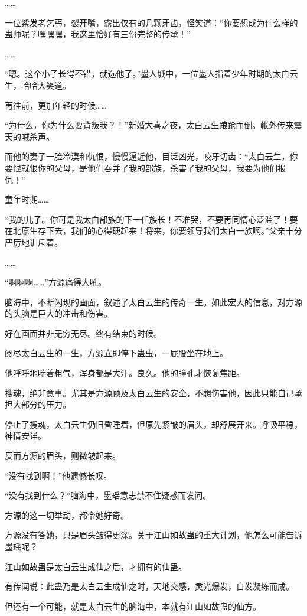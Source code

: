 \begin{this_body}
……

一位紫发老乞丐，裂开嘴，露出仅有的几颗牙齿，怪笑道：“你要想成为什么样的蛊师呢？嘿嘿嘿，我这里恰好有三份完整的传承！”

……

“嗯。这个小子长得不错，就选他了。”墨人城中，一位墨人指着少年时期的太白云生，哈哈大笑道。

再往前，更加年轻的时候……

“为什么，你为什么要背叛我？！”新婚大喜之夜，太白云生踉跄而倒。帐外传来震天的喊杀声。

而他的妻子一脸冷漠和仇恨，慢慢逼近他，目泛凶光，咬牙切齿：“太白云生，你要恨就恨你的父母，是他们吞并了我的部族，杀害了我的父母，我要为他们报仇！”

童年时期……

“我的儿子。你可是我太白部族的下一任族长！不准哭，不要再同情心泛滥了！要在北原生存下去，我们的心得硬起来！将来，你要领导我们太白一族啊。”父亲十分严厉地训斥着。

……

“啊啊啊……”方源痛得大吼。

脑海中，不断闪现的画面，叙述了太白云生的传奇一生。如此宏大的信息，对方源的头脑是巨大的冲击和伤害。

好在画面并非无穷无尽。终有结束的时候。

阅尽太白云生的一生，方源立即停下蛊虫，一屁股坐在地上。

他呼呼地喘着粗气，浑身都是大汗。良久。他的瞳孔才恢复焦距。

搜魂，绝非意事。尤其是方源顾及太白云生的安全，不想伤害他，因此只能自己承担大部分的压力。

停止了搜魂，太白云生仍旧昏睡着，但原先紧皱的眉头，却舒展开来。呼吸平稳，神情安详。

反而方源的眉头，则微皱起来。

“没有找到啊！”他遗憾长叹。

“没有找到什么？”脑海中，墨瑶意志禁不住疑惑而发问。

方源的这一切举动，都令她好奇。

方源没有答她，只是眉头皱得更深。关于江山如故蛊的重大计划，他怎么可能告诉墨瑶呢？

江山如故蛊是太白云生成仙之后，才拥有的仙蛊。

有传闻说：此蛊乃是太白云生成仙之时，天地交感，灵光爆发，自发凝练而成。

但还有一个可能，就是太白云生的脑海中，本就有江山如故蛊的仙方。


\end{this_body}
